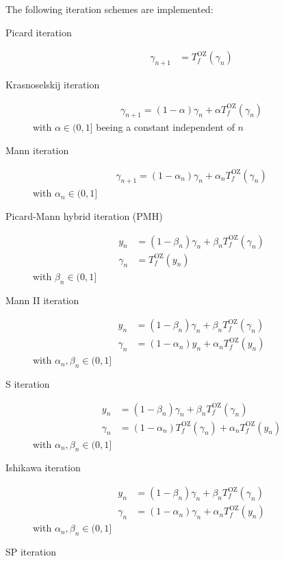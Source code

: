 The following iteration schemes are implemented:
\begin{description}
\item[Picard iteration \cite{Picard1890}]
\begin{align}
\gamma_{n+1} &= T^\mathrm{OZ}_f(\gamma_{n})
\end{align}
\item[Krasnoselskij iteration \cite{Krasnoselskij1955}]
\begin{align}
\gamma_{n+1} = (1-\alpha)\gamma_{n}+\alpha T^\mathrm{OZ}_f(\gamma_{n})
\end{align}
with $\alpha \in (0,1]$ beeing a constant independent of $n$
\item[Mann iteration \cite{Mann1953}]
\begin{align}
\gamma_{n+1} = (1-\alpha_n)\gamma_{n}+\alpha_n T^\mathrm{OZ}_f(\gamma_{n})
\end{align}
with $\alpha_n \in (0,1]$
\item[Picard-Mann hybrid iteration (PMH) \cite{Khan2013}]
\begin{align}
y_n      &= (1-\beta_n) \gamma_n + \beta_n T^\mathrm{OZ}_f(\gamma_{n}) \\
\gamma_n &= T^\mathrm{OZ}_f(y_{n})
\end{align}
with $\beta_n \in (0,1]$
\item[Mann II iteration \cite{Karahan2013a}]
\begin{align}
y_n      &= (1-\beta_n) \gamma_n + \beta_n T^\mathrm{OZ}_f(\gamma_{n}) \\
\gamma_n &= (1-\alpha_n) y_n + \alpha_n T^\mathrm{OZ}_f(y_{n})
\end{align}
with $\alpha_n,\beta_n \in (0,1]$
\item[S iteration \cite{Karahan2013,Agarwal2007}]
\begin{align}
y_n      &= (1-\beta_n) \gamma_n + \beta_n T^\mathrm{OZ}_f(\gamma_{n}) \\
\gamma_n &= (1-\alpha_n) T^\mathrm{OZ}_f(\gamma_{n}) + \alpha_n T^\mathrm{OZ}_f(y_{n})
\end{align}
with $\alpha_n,\beta_n \in (0,1]$
\item[Ishikawa iteration \cite{Ishikawa1974}]
\begin{align}
y_n      &= (1-\beta_n)  \gamma_n + \beta_n T^\mathrm{OZ}_f(\gamma_{n}) \\
\gamma_n &= (1-\alpha_n) \gamma_n + \alpha_n T^\mathrm{OZ}_f(y_{n})
\end{align}
with $\alpha_n,\beta_n \in (0,1]$
\item[SP iteration \cite{Phuengrattana2011}]

\end{description}
